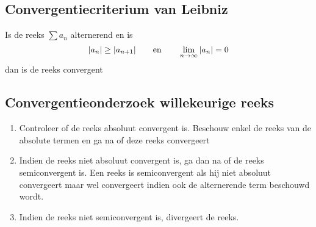 \documentclass{report}
\begin{document}
\subsection*{Convergentiecriterium van Leibniz}
Is de reeks $\sum a_n$ alternerend en is 
$$ |a_n| \geq |a_{n + 1}| \qquad \hbox{en} \qquad \lim_{n\to\infty} |a_n| = 0$$
dan is de reeks convergent

\subsection*{Convergentieonderzoek willekeurige reeks}
\begin{enumerate}
 \item Controleer of de reeks absoluut convergent is. Beschouw enkel de reeks van de absolute termen en ga na of deze reeks convergeert
 \item Indien de reeks niet absoluut convergent is, ga dan na of de reeks semiconvergent is. Een reeks is semiconvergent als hij niet absoluut convergeert maar wel convergeert indien ook de alternerende term beschouwd wordt.
 \item Indien de reeks niet semiconvergent is, divergeert de reeks.
\end{enumerate}
\end{document}
